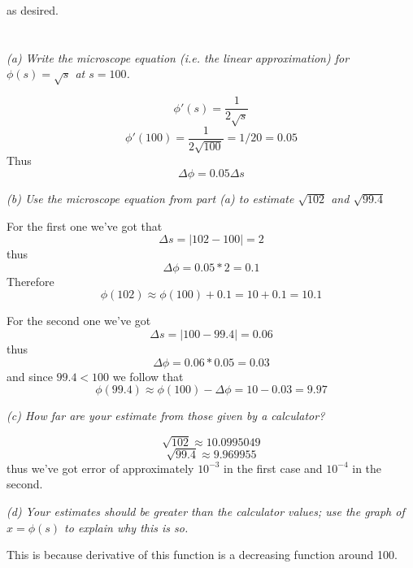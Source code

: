 \documentclass[11pt,oneside,titlepage]{book}
\begin{document}
as desired.

\section{}

\textit{(a) Write the microscope equation (i.e. the linear approximation) for
  $\phi(s) = \sqrt{s}$ at $s = 100$.}

$$\phi'(s) = \frac{1}{2 \sqrt{s}}$$
$$\phi'(100) = \frac{1}{2 \sqrt{100}} = 1/20 = 0.05$$
Thus
$$\Delta \phi = 0.05 \Delta s$$

\textit{(b) Use the microscope equation from part (a) to estimate $\sqrt{102}$ and $\sqrt{99.4}$}

For the first one we've got that
$$\Delta s = |102 - 100| = 2$$
thus
$$\Delta \phi = 0.05 * 2 = 0.1$$
Therefore
$$\phi(102) \approx \phi(100) + 0.1 = 10 + 0.1 = 10.1$$

For the second one we've got
$$\Delta s = |100 - 99.4| = 0.06$$
thus
$$\Delta \phi = 0.06 * 0.05 = 0.03$$
and since $99.4 < 100$ we follow that
$$\phi(99.4) \approx \phi(100) - \Delta \phi = 10 - 0.03 = 9.97$$

\textit{(c) How far are your estimate from those given by a calculator?}

$$\sqrt{102} \approx 10.0995049$$
$$\sqrt{99.4} \approx 9.969955$$
thus we've got  error of approximately $10^{-3}$ in the first case and $10^{-4}$ in the second.

\textit{(d) Your estimates should be greater than the calculator values; use the graph of
  $x = \phi(s)$ to explain why this is so.}

This is because derivative of this function is a  decreasing function around 100.
\end{document}
